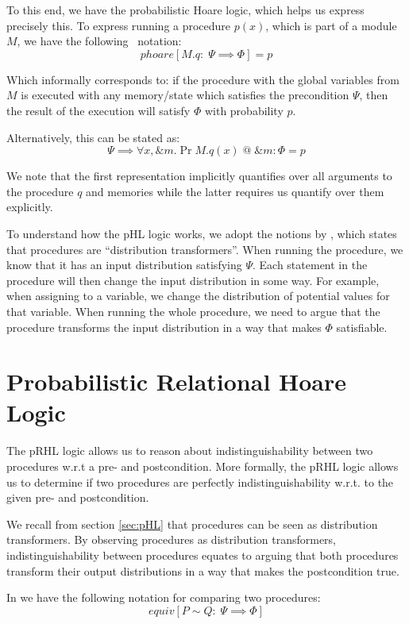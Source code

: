 To this end, we have the probabilistic Hoare logic, which helps us express precisely this.
To express running a procedure $p(x)$, which is part of a module $M$, we have the
following \easycrypt\ notation:
\[
  phoare[M.q :\; \Psi \implies \Phi] = p
\]

Which informally corresponds to: if the procedure with the global variables from $M$
is executed with any memory/state which satisfies the precondition $\Psi$, then the
result of the execution will satisfy $\Phi$ with probability $p$.

Alternatively, this can be stated as:
\begin{equation}
  \label{eq:proc_pr}
  \Psi \implies \forall x, \&m.\Pr{M.q(x) \; @ \; \&m : \Phi} = p
\end{equation}

We note that the first representation implicitly quantifies over all
arguments to the procedure $q$ and memories while the latter requires us
quantify over them explicitly.

To understand how the pHL logic works, we adopt the notions by \citet{ec_intro},
which states that procedures are ``distribution transformers''.
When running the procedure, we know that it has an input distribution satisfying
$\Psi$. Each statement in the procedure will then change the input distribution
in some way. For example, when assigning to a variable, we change the
distribution of potential values for that variable. When running the whole
procedure, we need to argue that the procedure transforms the input distribution
in a way that makes $\Phi$ satisfiable.

\section{Probabilistic Relational Hoare Logic}
\label{sec:pRHL}
The pRHL logic allows us to reason about indistinguishability between two
procedures w.r.t a pre- and postcondition. More formally, the pRHL logic
allows us to determine if two procedures are perfectly indistinguishability w.r.t.
to the given pre- and postcondition.

We recall from section \ref{sec:pHL} that procedures can be seen as distribution
transformers. By observing procedures as distribution transformers,
indistinguishability between procedures equates to arguing that both procedures
transform their output distributions in a way that makes the postcondition
true.

In \easycrypt we have the following notation for comparing two procedures:
\[
  equiv[P \sim Q :\; \Psi \implies \Phi ]
\]

